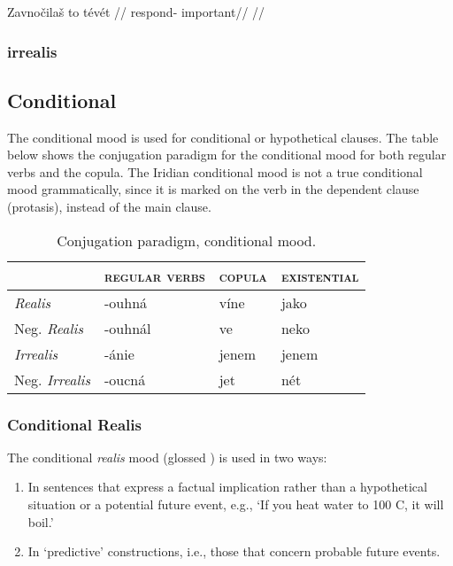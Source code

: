 \pex
\begingl
\gla Zavno\v{c}ila\v{s} to t\'ev\'et //
\glb respond-  important//
\glft {}//
\endgl
\xe

\subsubsection{irrealis}

\subsection{Conditional}
\par The conditional mood is used for conditional or hypothetical clauses. The table below shows the conjugation paradigm for the conditional mood for both regular verbs and the copula. The Iridian conditional mood is not a true conditional mood grammatically, since it is marked on the verb in the dependent clause (protasis), instead of the main clause.

\begin{table}[h!]
	\centering \small
	\caption{Conjugation paradigm, conditional mood.}
	\begin{tabu} to 0.8 \textwidth	{Y[1.3]MMM}
		\toprule
		&{\scshape regular verbs} & {\scshape copula} & {\scshape existential}\\
		\midrule
		
		\textit{Realis} &-ouhn\'a &v\'ine & jako\\
		Neg. \textit{Realis}&-ouhn\'al&ve&neko\\
	
		\textit{Irrealis} & -\'anie & jenem & jenem\\
		Neg. \textit{Irrealis} & -oucn\'a & jet & n\'et\\
		\bottomrule
	\end{tabu}
\end{table}

\subsubsection{Conditional Realis}

\par The conditional \textit{realis} mood (glossed ) is used in two ways:
\begin{enumerate}
	\item In sentences that express a factual implication rather than a hypothetical situation or a potential future event, e.g., `If you heat water to 100 C, it will boil.'
	\item In `predictive' constructions, i.e., those that concern probable future events.
\end{enumerate} 

